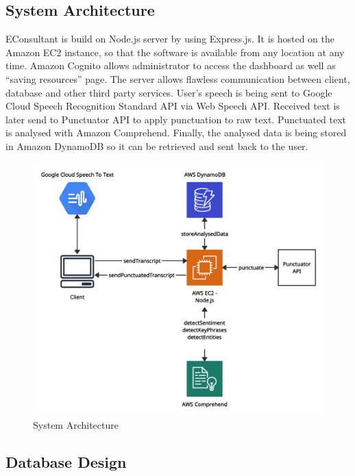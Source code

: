 \documentclass{article}
\begin{document}
\subsection{System Architecture}
{\large
EConsultant is build on Node.js server by using Express.js. It is hosted on the Amazon EC2 instance, so that the software is available from any location at any time. Amazon Cognito allows administrator to access the dashboard as well as ``saving resources'' page. The server allows flawless communication between client, database and other third party services. User's speech is being sent to Google Cloud Speech Recognition Standard API via Web Speech API. Received text is later send to Punctuator API to apply punctuation to raw text. Punctuated text is analysed with Amazon Comprehend. Finally, the analysed data is being stored in Amazon DynamoDB so it can be retrieved and sent back to the user.\par
}
\begin{figure}[H]
  \centering
  \includegraphics[scale=0.26]{img/architecture.png}
  \caption{System Architecture}
  \label{fig:System Architecture}
\end{figure}

\subsection{Database Design}
\end{document}
